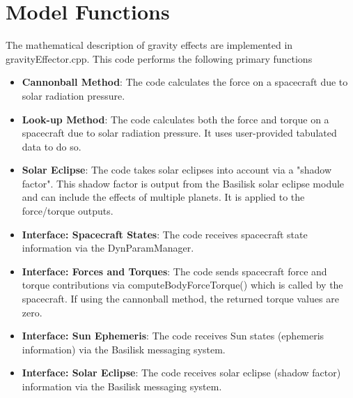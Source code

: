 \section{Model Functions}
The mathematical description of gravity effects are implemented in gravityEffector.cpp. This code performs the following primary functions
\begin{itemize}
	\item \textbf{Cannonball Method}: The code calculates the force on a spacecraft due to solar radiation pressure.
	\item \textbf{Look-up Method}: The code calculates both the force and torque on a spacecraft due to solar radiation pressure. It uses user-provided tabulated data to do so.
	\item \textbf{Solar Eclipse}: The code takes solar eclipses into account via a "shadow factor". This shadow factor is output from the Basilisk solar eclipse module and can include the effects of multiple planets. It is applied to the force/torque outputs.
	\item \textbf{Interface: Spacecraft States}: The code receives spacecraft state information via the DynParamManager.
	\item \textbf{Interface: Forces and Torques}: The code sends spacecraft force and torque contributions via computeBodyForceTorque() which is called by the spacecraft.	If using the cannonball method, the returned torque values are zero.
	\item \textbf{Interface: Sun Ephemeris}: The code receives Sun states (ephemeris information) via the Basilisk messaging system.
	\item \textbf{Interface: Solar Eclipse}: The code receives solar eclipse (shadow factor) information via the Basilisk messaging system.
	
\end{itemize}



